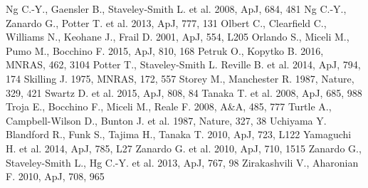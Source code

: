 \documentclass{aa}
\begin{document}
\begin{thebibliography}{99}
 Ng C.-Y., Gaensler B., Staveley-Smith L. et al. 2008, ApJ, 684, 481   
 {Ng C.-Y., Zanardo G., Potter T. et al. 2013, ApJ, 777, 131} 
 Olbert C., Clearfield C., Williams N., Keohane J., Frail D. 2001, ApJ, 554, L205
 Orlando S., Miceli M., Pumo M., Bocchino F. 2015, ApJ, 810, 168
 Petruk O., Kopytko B. 2016, MNRAS, 462, 3104
 Potter T., Staveley-Smith L. Reville B. et al. 2014, ApJ, 794, 174
 Skilling J. 1975, MNRAS, 172, 557 
 Storey M., Manchester R. 1987, Nature, 329, 421
 Swartz D. et al. 2015, ApJ, 808, 84
 Tanaka T. et al. 2008, ApJ, 685, 988
 Troja E., Bocchino F., Miceli M., Reale F. 2008, A\&A, 485, 777
 Turtle A., Campbell-Wilson D., Bunton J. et al. 1987, Nature, 327, 38
 Uchiyama Y. Blandford R., Funk S., Tajima H., Tanaka T. 2010, ApJ, 723, L122
 Yamaguchi H. et al. 2014, ApJ, 785, L27
 Zanardo G. et al. 2010, ApJ, 710, 1515
 Zanardo G., Staveley-Smith L., Hg C.-Y. et al. 2013, ApJ, 767, 98
 Zirakashvili V., Aharonian F. 2010, ApJ, 708, 965 
\end{thebibliography}
\end{document}
